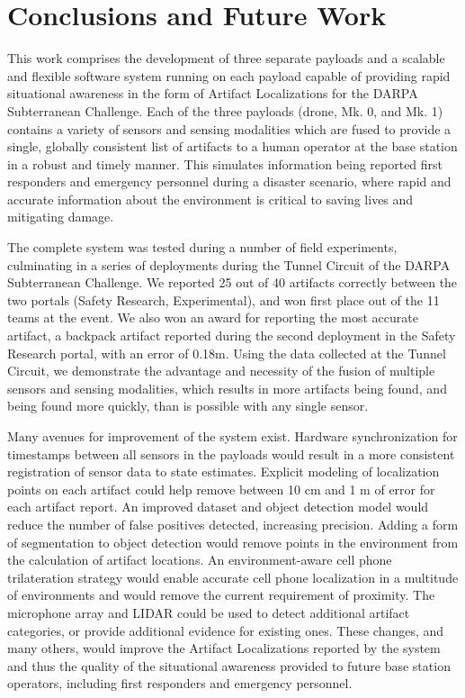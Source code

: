 \chapter{Conclusions and Future Work}

This work comprises the development of three separate payloads and a scalable and flexible software system running on each payload capable of providing rapid situational awareness in the form of Artifact Localizations for the DARPA Subterranean Challenge. Each of the three payloads (drone, Mk. 0, and Mk. 1) contains a variety of sensors and sensing modalities which are fused to provide a single, globally consistent list of artifacts to a human operator at the base station in a robust and timely manner. This simulates information being reported first responders and emergency personnel during a disaster scenario, where rapid and accurate information about the environment is critical to saving lives and mitigating damage.

The complete system was tested during a number of field experiments, culminating in a series of deployments during the Tunnel Circuit of the DARPA Subterranean Challenge. We reported 25 out of 40 artifacts correctly between the two portals (Safety Research, Experimental), and won first place out of the 11 teams at the event. We also won an award for reporting the most accurate artifact, a backpack artifact reported during the second deployment in the Safety Research portal, with an error of 0.18m. Using the data collected at the Tunnel Circuit, we demonstrate the advantage and necessity of the fusion of multiple sensors and sensing modalities, which results in more artifacts being found, and being found more quickly, than is possible with any single sensor.

Many avenues for improvement of the system exist. Hardware synchronization for timestamps between all sensors in the payloads would result in a more consistent registration of sensor data to state estimates. Explicit modeling of localization points on each artifact could help remove between 10 cm and 1 m of error for each artifact report. An improved dataset and object detection model would reduce the number of false positives detected, increasing precision. Adding a form of segmentation to object detection would remove points in the environment from the calculation of artifact locations. An environment-aware cell phone trilateration strategy would enable accurate cell phone localization in a multitude of environments and would remove the current requirement of proximity. The microphone array and LIDAR could be used to detect additional artifact categories, or provide additional evidence for existing ones. These changes, and many others, would improve the Artifact Localizations reported by the system and thus the quality of the situational awareness provided to future base station operators, including first responders and emergency personnel.